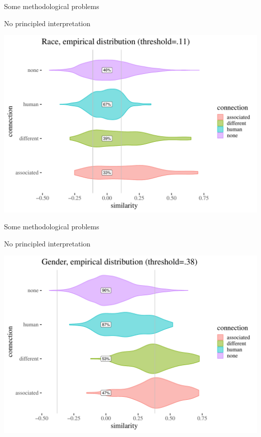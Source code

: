 \documentclass[
  10pt,
  ignorenonframetext,
  x11names, dvipsnames, bibspacing,natbib, table]{beamer}
\begin{document}
\begin{frame}{Some methodological problems}
\protect\hypertarget{some-methodological-problems-8}{}
\begin{block}{No principled interpretation}
\protect\hypertarget{no-principled-interpretation-2}{}
\begin{center}\includegraphics[width=0.9\linewidth]{presentationBoston_files/figure-beamer/unnamed-chunk-7-1} \end{center}
\end{block}
\end{frame}

\begin{frame}{Some methodological problems}
\protect\hypertarget{some-methodological-problems-9}{}
\begin{block}{No principled interpretation}
\protect\hypertarget{no-principled-interpretation-3}{}
\begin{center}\includegraphics[width=0.9\linewidth]{presentationBoston_files/figure-beamer/unnamed-chunk-8-1} \end{center}
\end{block}
\end{frame}
\end{document}
